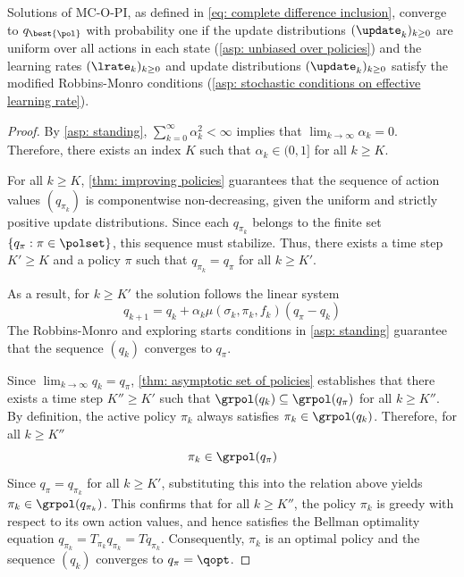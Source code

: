 \begin{proposition}
\label{thm: convergence uniform}
    Solutions of MC-O-PI, as defined in \eqref{eq: complete difference inclusion}, converge to $q_{\best{\pol}}$ with probability one
    if the update distributions $(\update_k)_{k \geq 0}$ are uniform over all actions in each state (\autoref{asp: unbiased over policies})
    and the learning rates $(\lrate_k)_{k \geq 0}$ and update distributions $(\update_k)_{k \geq 0}$ satisfy the modified Robbins-Monro conditions (\autoref{asp: stochastic conditions on effective learning rate}).
\end{proposition}
% 
\begin{proof}
By \autoref{asp: standing}, $\sum_{k=0}^{\infty} \alpha_k^2 < \infty$ implies that $\lim_{k \to \infty} \alpha_k = 0$. Therefore, there exists an index $K$ such that $\alpha_k \in (0, 1]$ for all $k \ge K$.

For all $k \ge K$, \autoref{thm: improving policies} guarantees that the sequence of action values $(q_{\pi_k})$ is componentwise non-decreasing, given the uniform and strictly positive update distributions.
Since each $q_{\pi_k}$ belongs to the finite set $\{q_\pi : \pi \in \polset\}$, this sequence must stabilize. Thus, there exists a time step $K' \ge K$ and a policy $\pi$ such that $q_{\pi_k} = q_\pi$ for all $k \ge K'$.


As a result, for $k \ge K'$ the solution follows the linear system
\[
q_{k+1} = q_k + \alpha_k \mu(\sigma_k, \pi_k, f_k)( q_\pi - q_k)
\]
The Robbins-Monro and exploring starts conditions in \autoref{asp: standing} guarantee that the sequence $(q_k)$ converges to $q_\pi$.

Since $\lim_{k \to \infty} q_k = q_\pi$, \autoref{thm: asymptotic set of policies} establishes that there exists a time step $K'' \ge K'$ such that $\grpol(q_k) \subseteq \grpol(q_\pi)$ for all $k \ge K''$.
By definition, the active policy $\pi_k$ always satisfies $\pi_k \in \grpol(q_k)$. 
Therefore, for all $k \ge K''$
\[
\pi_k \in \grpol(q_\pi)
\]
Since $q_\pi = q_{\pi_k}$ for all $k \ge K'$, substituting this into the relation above yields $\pi_k \in \grpol(q_{\pi_k})$.
This confirms that for all $k \ge K''$, the policy $\pi_k$ is greedy with respect to its own action values, and hence satisfies the Bellman optimality equation $q_{\pi_k} = T_{\pi_k} q_{\pi_k} = T q_{\pi_k}$.
Consequently, $\pi_k$ is an optimal policy and the sequence $(q_k)$ converges to $q_\pi = \qopt$.
\end{proof}
